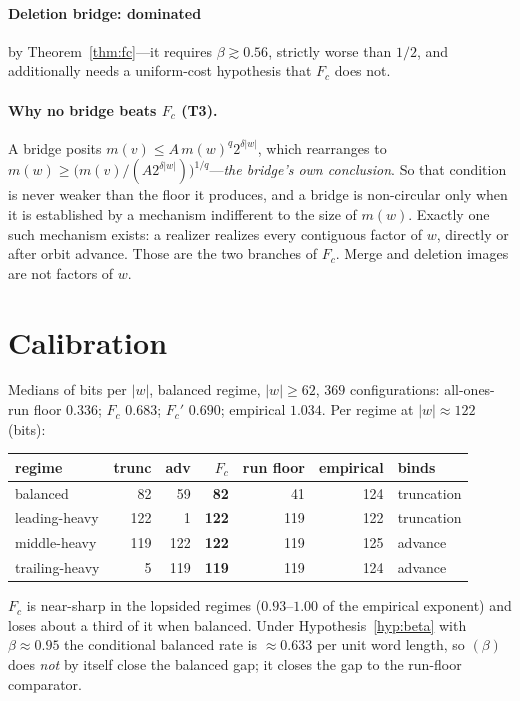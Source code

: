 \documentclass[11pt,a4paper]{article}
\theoremstyle{plain}
\theoremstyle{definition}
\newcommand{\Fc}{F_{c}}
\begin{document}
\paragraph{Deletion bridge: dominated} by Theorem~\ref{thm:fc}---it requires
$\beta\gtrsim0.56$, strictly worse than $1/2$, and additionally needs a
uniform-cost hypothesis that $\Fc$ does not.

\paragraph{Why no bridge beats $\Fc$ (T3).}
A bridge posits $m(v)\le A\,m(w)^{q}2^{\delta|w|}$, which rearranges to
$m(w)\ge\bigl(m(v)/(A2^{\delta|w|})\bigr)^{1/q}$---\emph{the bridge's own
conclusion}. So that condition is never weaker than the floor it produces, and
a bridge is non-circular only when it is established by a mechanism indifferent
to the size of $m(w)$. Exactly one such mechanism exists: a realizer realizes
every contiguous factor of $w$, directly or after orbit advance. Those are the
two branches of $\Fc$. Merge and deletion images are not factors of $w$.

\section{Calibration}

Medians of bits per $|w|$, balanced regime, $|w|\ge62$, $369$ configurations:
all-ones-run floor $0.336$; $\Fc$ $0.683$; $\Fc'$ $\mathbf{0.690}$;
empirical $1.034$.
Per regime at $|w|\approx122$ (bits):

\begin{center}
\begin{tabular}{@{}lrrrrrl@{}}
\toprule
regime & trunc & adv & $\Fc$ & run floor & empirical & binds\\
\midrule
balanced & 82 & 59 & \textbf{82} & 41 & 124 & truncation\\
leading-heavy & 122 & 1 & \textbf{122} & 119 & 122 & truncation\\
middle-heavy & 119 & 122 & \textbf{122} & 119 & 125 & advance\\
trailing-heavy & 5 & 119 & \textbf{119} & 119 & 124 & advance\\
\bottomrule
\end{tabular}
\end{center}

\noindent $\Fc$ is near-sharp in the lopsided regimes ($0.93$--$1.00$ of the
empirical exponent) and loses about a third of it when balanced. Under
Hypothesis~\ref{hyp:beta} with $\beta\approx0.95$ the conditional balanced rate
is $\approx0.633$ per unit word length, so $(\beta)$ does \emph{not} by itself
close the balanced gap; it closes the gap to the run-floor comparator.
\end{document}
